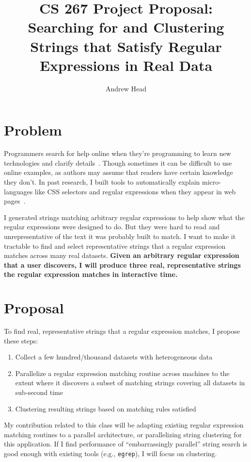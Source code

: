 \documentclass[10pt]{article}
\begin{document}
\title{\Large CS 267 Project Proposal: Searching for and Clustering \\
Strings that Satisfy Regular Expressions in Real Data}
\author{\large Andrew Head}
\date{}
\maketitle

\titleformat{\section}{\normalfont\fontsize{11}{13}\bfseries}{\thesection}{1em}{}

\vspace{-5ex}
\section{Problem}

Programmers search for help online when they're programming  to learn new technologies and clarify details~\cite{brandt_two_2009}.
Though sometimes it can be difficult to use online examples, as authors may assume that readers have certain knowledge they don't.
In past research, I built tools to automatically explain micro-languages like CSS selectors and regular expressions when they appear in web pages~\cite{head_tutorons_2015}.

I generated strings matching arbitrary regular expressions to help show what the regular expressions were designed to do.
But they were hard to read and unrepresentative of the text it was probably built to match.
I want to make it tractable to find and select representative strings that a regular expression matches across many real datasets.
\textbf{Given an arbitrary regular expression that a user discovers, I will produce
three real, representative strings the regular expression matches in interactive time.}

\section{Proposal}

To find real, representative strings that a regular expression matches, I propose these steps:
\begin{enumerate}[noitemsep]
\item Collect a few hundred/thousand datasets with heterogeneous data
\item Parallelize a regular expression matching routine across machines to the extent where it discovers a subset of matching strings covering all datasets in sub-second time
\item Clustering resulting strings based on matching rules satisfied
\end{enumerate}
My contribution related to this class will be adapting existing regular expression matching routines to a parallel architecture, or parallelizing string clustering for this application.
If I find performance of ``embarrassingly parallel'' string search is good enough with existing tools (e.g., \texttt{egrep}), I will focus on clustering.
\end{document}
